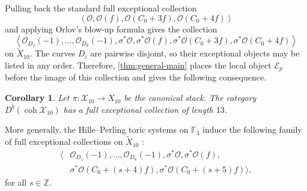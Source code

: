 \documentclass[11pt]{article}
\theoremstyle{plain}
\newtheorem{corollary}[corollary]{Corollary}
\theoremstyle{definition}
\theoremstyle{remark}
\newcommand{\F}{\mathbb F}
\newcommand{\Z}{\mathbb Z}
\newcommand{\Db}{D^b}
\newcommand{\coh}{\operatorname{coh}}
\newcommand{\OO}{\mathcal O}
\begin{document}
Pulling back the standard full exceptional collection
\[
\left\langle
\OO,\OO(f),\OO(C_0+3f),\OO(C_0+4f)
\right\rangle
\]
and applying Orlov's blow-up formula gives the collection
\[
\left\langle
\OO_{D_1}(-1),\dots,\OO_{D_8}(-1),
\sigma^*\OO,\sigma^*\OO(f),
\sigma^*\OO(C_0+3f),\sigma^*\OO(C_0+4f)
\right\rangle
\]
on \(\widetilde X_{10}\). The curves \(D_i\) are pairwise disjoint, so their exceptional objects may be listed in any order. Therefore, \cref{thm:general-main} places the local object \(\mathcal E_p\) before the image of this collection and gives the following consequence.

\begin{corollary}\label{cor:X10-stack-fec} 
Let \(\pi:\mathcal X_{10}\to X_{10}\) be the canonical stack. The category \(\Db(\coh\mathcal X_{10})\) has a full exceptional collection of length \(13\).
\end{corollary} 

More generally, the Hille--Perling toric systems on \(\F_3\) induce the
following family of full exceptional collections on \(\widetilde X_{10}\)
\cite[Proposition~5.2]{HillePerling2011}:
\[
\begin{aligned}
\big\langle &\OO_{D_1}(-1),\dots,\OO_{D_8}(-1), \sigma^*\OO,\sigma^*\OO(f),\\ 
&\sigma^*\OO(C_0+(s+4)f),\sigma^*\OO(C_0+(s+5)f) \big\rangle,
\end{aligned}
\]
for all $s\in\Z$.
\end{document}
